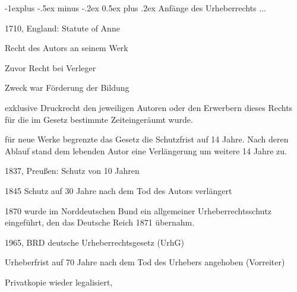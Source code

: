 \documentclass[a4paper]{article}
\makeatletter
\renewcommand{\subsection}{\@startsection{subsection}{2}{0mm}%
                                {-1explus -.5ex minus -.2ex}%
                                {0.5ex plus .2ex}%
                                {\normalfont\normalsize\bfseries}}
\makeatother
\begin{document}
\begin{multicols*}{3}
  \subsection{Anfänge des Urheberrechts ...}
  \begin{itemize*}
    \item 1710, England: Statute of Anne
    \begin{itemize*}
      \item Recht des Autors an seinem Werk
      \item Zuvor Recht bei Verleger
      \item Zweck war Förderung der Bildung
      \item exklusive Druckrecht den jeweiligen Autoren oder den Erwerbern dieses Rechts für die im Gesetz bestimmte Zeiteingeräumt wurde.
      \item für neue Werke begrenzte das Gesetz die Schutzfrist auf 14 Jahre. Nach deren Ablauf stand dem lebenden Autor eine Verlängerung um weitere 14 Jahre zu.
    \end{itemize*}
    \item 1837, Preußen: Schutz von 10 Jahren
    \item 1845 Schutz auf 30 Jahre nach dem Tod des Autors verlängert
    \item 1870 wurde im Norddeutschen Bund ein allgemeiner Urheberrechtsschutz eingeführt, den das Deutsche Reich 1871 übernahm.
    \item 1965, BRD deutsche Urheberrechtsgesetz (UrhG)
    \begin{itemize*}
      \item Urheberfrist auf 70 Jahre nach dem Tod des Urhebers angehoben (Vorreiter)
      \item Privatkopie wieder legalisiert,
    \end{itemize*}
  \end{itemize*}


\end{multicols*}
\end{document}
